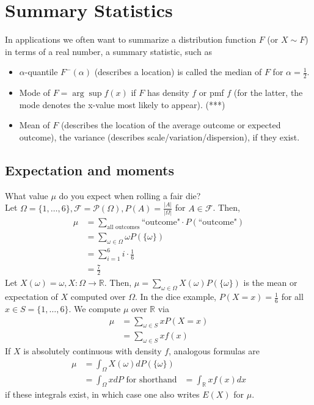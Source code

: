 \documentclass{article}
\newcommand{\R}{\mathbb{R}}
\begin{document}
	\section{Summary Statistics}
	In applications we often want to summarize a distribution function $F$ (or $X\sim F$) in terms of a real number, a summary statistic, such as
	\begin{itemize}
		\item $\alpha$-quantile $F^-(\alpha)$ (describes a location) is called the median of $F$ for $\alpha=\frac{1}{2}$.
		
		\item Mode of $F=\arg\sup f(x)$ if $F$ has density $f$ or pmf $f$ (for the latter, the mode denotes the x-value most likely to appear). (***)
		
		\item Mean of $F$ (describes the location of the average outcome or expected outcome), the variance (describes scale/variation/dispersion), if they exist.
	\end{itemize}
	
	\subsection{Expectation and moments}
	What value $\mu$ do you expect when rolling a fair die?\\
	
	Let $\Omega=\{1, \dots, 6\}, \mathcal{F}=\mathcal{P}(\Omega), P(A)=\frac{|A|}{|\Omega|}$ for $A\in\mathcal{F}$. Then, 
	\begin{align*}
		 \mu&=\sum_{\mbox{all outcomes}}\mbox{``outcome"}\cdot P(\mbox{``outcome"})\\
		 &=\sum_{\omega\in\Omega}\omega P(\{\omega\})\\
		 &=\sum_{i=1}^6i\cdot\frac{1}{6}\\
		 &=\frac{7}{2}
	\end{align*}
	Let $X(\omega)=\omega, X : \Omega\to\R$. Then, $\mu=\sum_{\omega\in\Omega}X(\omega)P(\{\omega\})$ is the mean or expectation of $X$ computed over $\Omega$. In the dice example, $P(X=x)=\frac{1}{6}$ for all $x\in S=\{1, \dots, 6\}$. We compute $\mu$ over $\R$ via
	\begin{align*}
		\mu&=\sum_{\omega\in S}xP(X=x)\\
		&=\sum_{\omega\in S}xf(x)
	\end{align*}
	If $X$ is absolutely continuous with density $f$, analogous formulas are
	\begin{align*}
		\mu&=\int_{\Omega}X(\omega)dP(\{\omega\})\\
		&=\int_{\Omega}xdP\mbox{ for shorthand}
		&=\int_{\R}xf(x)dx
	\end{align*}
	if these integrals exist, in which case one also writes $E(X)$ for $\mu$.\\
	
\end{document}
